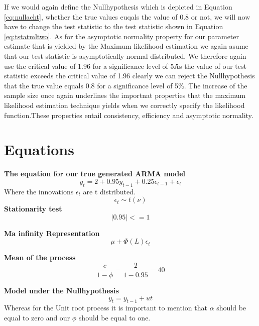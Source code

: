 \documentclass[12pt]{article}
\begin{document}
If we would again define the Nullhypothesis which is depicted in Equation  \ref{eq:nullacht}, whether the true values euqals the value of 0.8 or not, we will now have to change the test statistic to the test statistic shown in Equation \ref{eq:tstatmltwo}.
As for the asymptotic normality property for our parameter estimate that is yielded by the Maximum likelihood estimation we again asume that our test statistic is asymptotically normal distributed. We therefore again use the critical value of 1.96 for a significance level of 5\.%
As the value of our test statistic exceeds the critical value of 1.96 clearly we can reject the Nullhypothesis that the true value equals 0.8 for a significance level of 5\%.
The increase of the sample size once again underlines the importnat properties that the maximum likelihood estimation technique yields when we correctly specify the likelihood function.These properties entail consistency, efficiency and asymptotic normality.
 




\newpage
\section{Equations}
\textbf{The equation for our true generated ARMA model}
\begin{equation}
    y_t = 2 + 0.95y_{t-1} + 0.25\epsilon_{t-1} + \epsilon_t
\label{eq:arma}
\end{equation}
Where the innovations $\epsilon_t$ are t distributed.
 \begin{equation}
     \epsilon_t \sim t(\nu) 
 \end{equation}
\textbf{Stationarity test}
\begin{equation}
    |0.95| <= 1
    \label{eq:stat}
\end{equation}

\textbf{Ma infinity Representation}
 \begin{equation}
    \mu + \Phi(L)\epsilon_t
    \label{eq:Mainf}
 \end{equation}

 \textbf{Mean of the process}
 \begin{equation}
\frac{c}{1-\phi} = \frac{2}{1-0.95} = 40
\label{eq:Mean}
\end{equation}

\textbf{Model under the Nullhypothesis}
\begin{equation}
    y_t = y_{t-1} + ut
    \label{eq:true}
\end{equation}
Whereas for the Unit root process it is important to mention that $\alpha$ should be equal to zero and our $\phi$ should be equal to one.\\
\end{document}
